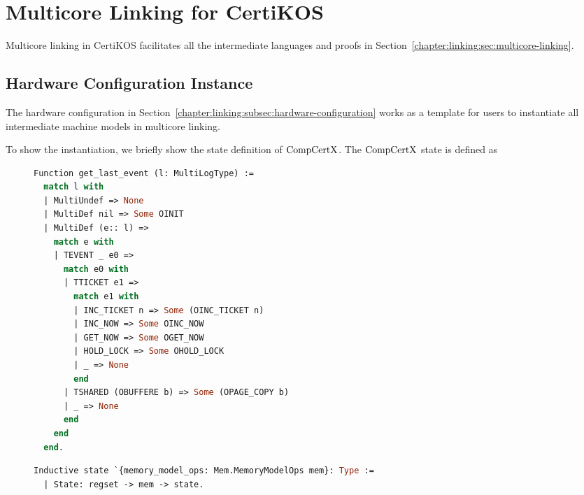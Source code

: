 \section{Multicore Linking for CertiKOS}
\label{chapter:certikos:sec:multicore-linking-for-certikos}

Multicore linking in CertiKOS facilitates all the intermediate languages
and proofs in Section~\ref{chapter:linking:sec:multicore-linking}.

\subsection{Hardware Configuration Instance}
\label{chapter:certikos:subsec:hardware-configuration-instance}

The hardware configuration in Section~\ref{chapter:linking:subsec:hardware-configuration} works as a 
template for users to instantiate all intermediate machine models in multicore linking. 

To show the instantiation,
we briefly show the state definition of $\mathrm{CompCertX}$. 
The $\mathrm{CompCertX}$ state is defined as

\begin{figure}
\begin{lstlisting}[language=Caml]
Function get_last_event (l: MultiLogType) :=
  match l with
  | MultiUndef => None
  | MultiDef nil => Some OINIT
  | MultiDef (e:: l) =>
    match e with
    | TEVENT _ e0 =>
      match e0 with
      | TTICKET e1 =>
        match e1 with
        | INC_TICKET n => Some (OINC_TICKET n)
        | INC_NOW => Some OINC_NOW       
        | GET_NOW => Some OGET_NOW
        | HOLD_LOCK => Some OHOLD_LOCK
        | _ => None
        end
      | TSHARED (OBUFFERE b) => Some (OPAGE_COPY b)
      | _ => None
      end
    end
  end.
\end{lstlisting} 
\end{figure}

\begin{figure}
\begin{lstlisting}[language=Caml]
 Inductive state `{memory_model_ops: Mem.MemoryModelOps mem}: Type :=
  | State: regset -> mem -> state.
\end{lstlisting}
\end{figure}


